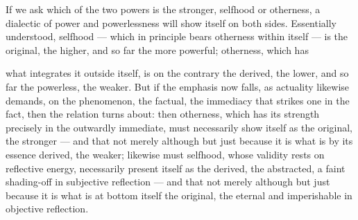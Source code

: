 \documentclass[12pt,a4paper]{book}
\begin{document}
If we ask which of the two powers is the stronger, selfhood or otherness, a
dialectic of power and powerlessness will show itself on both sides. Essentially
understood, selfhood --- which in principle bears otherness within itself --- is
the original, the higher, and so far the more powerful; otherness, which has

what integrates it outside itself, is on the contrary the derived, the lower, and
so far the powerless, the weaker. But if the emphasis now falls, as actuality
likewise demands, on the phenomenon, the factual, the immediacy that strikes one
in the fact, then the relation turns about: then otherness, which has its strength
precisely in the outwardly immediate, must necessarily show itself as the original,
the stronger --- and that not merely although but just because it is what is by its
essence derived, the weaker; likewise must selfhood, whose validity rests on
reflective energy, necessarily present itself as the derived, the abstracted, a
faint shading-off in subjective reflection --- and that not merely although but
just because it is what is at bottom itself the original, the eternal and
imperishable in objective reflection.
\end{document}

